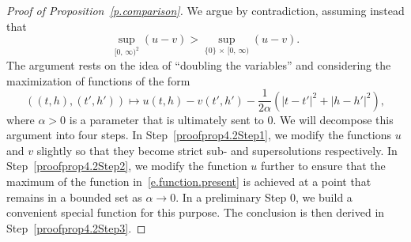 \documentclass[AHL,Unicode,longabstracts,published]{cedram}
\newcommand{\1}{\mathds{1}}
\newcommand{\al}{\alpha}
\newcounter{stepcount}
\begin{document}
\begin{proof}[Proof of Proposition~\ref{p.comparison}]
We argue by contradiction, assuming instead that
\begin{equation}\label{e.max.int}
\sup_{[0,\,\infty)^2} (u-v) > \sup_{\{0\}\,\times\,[0,\,\infty)} (u-v).
\end{equation}
The argument rests on the idea of ``doubling the variables'' and considering the maximization of functions of the form
\begin{equation}\label{e.function.present}
\left((t,h),(t',h')\right) \mapsto u(t,h) - v(t',h') - \frac 1 {2\al} \left(|t-t'|^2 + |h-h'|^2 \right),
\end{equation}
where $\alpha > 0$ is a parameter that is ultimately sent to $0$. We will decompose this argument into four steps. In Step~\ref{proofprop4.2Step1}, we modify the functions $u$ and $v$ slightly so that they become strict sub- and supersolutions respectively. In Step~\ref{proofprop4.2Step2}, we modify the function $u$ further to ensure that the maximum of the function in~\eqref{e.function.present} is achieved at a point that remains in a bounded set as $\al \to 0$. In a preliminary Step 0, we build a convenient special function for this purpose. The conclusion is then derived in Step~\ref{proofprop4.2Step3}.


\setcounter{stepcount}{-1}


\end{proof}
\end{document}
